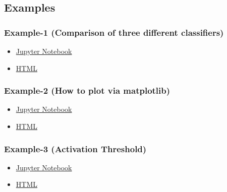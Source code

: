 \documentclass[11pt]{article}
\providecommand{\tightlist}{%
      \setlength{\itemsep}{0pt}\setlength{\parskip}{0pt}}
\begin{document}
    \hypertarget{examples}{%
\subsection{Examples}\label{examples}}

    \hypertarget{example-1-comparison-of-three-different-classifiers}{%
\subsubsection{Example-1 (Comparison of three different
classifiers)}\label{example-1-comparison-of-three-different-classifiers}}

\begin{itemize}
\tightlist
\item
  \href{https://nbviewer.jupyter.org/github/sepandhaghighi/pycm/blob/master/Document/Example1.ipynb}{Jupyter
  Notebook}
\item
  \href{http://www.shaghighi.ir/pycm/doc/Example1.html}{HTML}
\end{itemize}

\hypertarget{example-2-how-to-plot-via-matplotlib}{%
\subsubsection{Example-2 (How to plot via
matplotlib)}\label{example-2-how-to-plot-via-matplotlib}}

\begin{itemize}
\tightlist
\item
  \href{https://nbviewer.jupyter.org/github/sepandhaghighi/pycm/blob/master/Document/Example2.ipynb}{Jupyter
  Notebook}
\item
  \href{http://www.shaghighi.ir/pycm/doc/Example2.html}{HTML}
\end{itemize}

\hypertarget{example-3-activation-threshold}{%
\subsubsection{Example-3 (Activation
Threshold)}\label{example-3-activation-threshold}}

\begin{itemize}
\tightlist
\item
  \href{https://nbviewer.jupyter.org/github/sepandhaghighi/pycm/blob/master/Document/Example3.ipynb}{Jupyter
  Notebook}
\item
  \href{http://www.shaghighi.ir/pycm/doc/Example3.html}{HTML}
\end{itemize}
\end{document}
